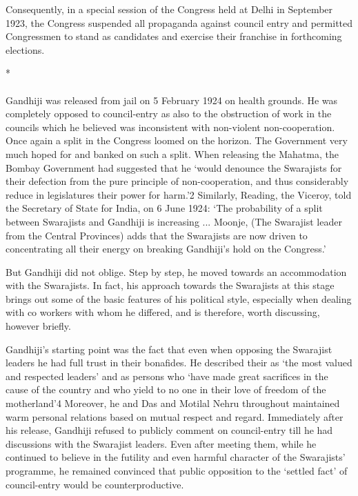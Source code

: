 Consequently, in a special session of the Congress held at Delhi in September 1923, the Congress suspended all propaganda against council entry and permitted Congressmen to stand as candidates and exercise their franchise in forthcoming elections.

\begin{center}*\end{center}

\paragraph*{}


Gandhiji was released from jail on 5 February 1924 on health grounds. He was completely opposed to council-entry as also to the obstruction of work in the councils which he believed was inconsistent with non-violent non-cooperation. Once again a split in the Congress loomed on the horizon. The Government very much hoped for and banked on such a split. When releasing the Mahatma, the Bombay Government had suggested that he `would denounce the Swarajists for their defection from the pure principle of non-cooperation, and thus considerably reduce in legislatures their power for harm.'2 Similarly, Reading, the Viceroy, told the Secretary of State for India, on 6 June 1924: `The probability of a split between Swarajists and Gandhiji is increasing ... Moonje, (The Swarajist leader from the Central Provinces) adds that the Swarajists are now driven to concentrating all their energy on breaking Gandhiji's hold on the Congress.'

But Gandhiji did not oblige. Step by step, he moved towards an accommodation with the Swarajists. In fact, his approach towards the Swarajists at this stage brings out some of the basic features of his political style, especially when dealing with co­ workers with whom he differed, and is therefore, worth discussing, however briefly.

Gandhiji's starting point was the fact that even when opposing the Swarajist leaders he had full trust in their bonafides. He described their as `the most valued and respected leaders' and as persons who `have made great sacrifices in the cause of the country and who yield to no one in their love of freedom of the motherland'4 Moreover, he and Das and Motilal Nehru throughout maintained warm personal relations based on mutual respect and regard. Immediately after his release, Gandhiji refused to publicly comment on council-entry till he had discussions with the Swarajist leaders. Even after meeting them, while he continued to believe in the futility and even harmful character of the Swarajists' programme, he remained convinced that public opposition to the `settled fact' of council-entry would be counterproductive.

